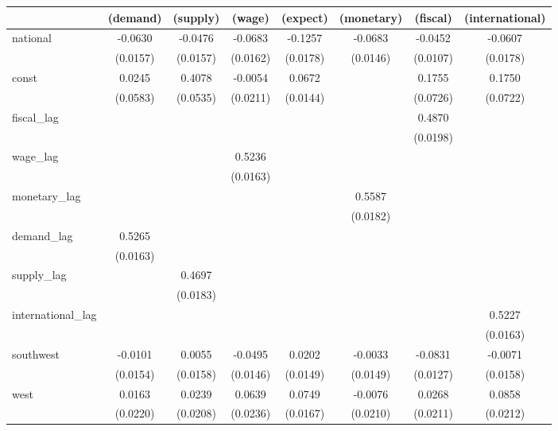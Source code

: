 \begin{tabular}{lccccccc}
\toprule
 & (demand) & (supply) & (wage) & (expect) & (monetary) & (fiscal) & (international) \\
\midrule
national & -0.0630 & -0.0476 & -0.0683 & -0.1257 & -0.0683 & -0.0452 & -0.0607 \\
\vspace{0.2cm}
 & (0.0157) & (0.0157) & (0.0162) & (0.0178) & (0.0146) & (0.0107) & (0.0178) \\
const & 0.0245 & 0.4078 & -0.0054 & 0.0672 &  & 0.1755 & 0.1750 \\
\vspace{0.2cm}
 & (0.0583) & (0.0535) & (0.0211) & (0.0144) &  & (0.0726) & (0.0722) \\
fiscal_lag &  &  &  &  &  & 0.4870 &  \\
\vspace{0.2cm}
 &  &  &  &  &  & (0.0198) &  \\
wage_lag &  &  & 0.5236 &  &  &  &  \\
\vspace{0.2cm}
 &  &  & (0.0163) &  &  &  &  \\
monetary_lag &  &  &  &  & 0.5587 &  &  \\
\vspace{0.2cm}
 &  &  &  &  & (0.0182) &  &  \\
demand_lag & 0.5265 &  &  &  &  &  &  \\
\vspace{0.2cm}
 & (0.0163) &  &  &  &  &  &  \\
supply_lag &  & 0.4697 &  &  &  &  &  \\
\vspace{0.2cm}
 &  & (0.0183) &  &  &  &  &  \\
international_lag &  &  &  &  &  &  & 0.5227 \\
\vspace{0.2cm}
 &  &  &  &  &  &  & (0.0163) \\
southwest & -0.0101 & 0.0055 & -0.0495 & 0.0202 & -0.0033 & -0.0831 & -0.0071 \\
\vspace{0.2cm}
 & (0.0154) & (0.0158) & (0.0146) & (0.0149) & (0.0149) & (0.0127) & (0.0158) \\
west & 0.0163 & 0.0239 & 0.0639 & 0.0749 & -0.0076 & 0.0268 & 0.0858 \\
\vspace{0.2cm}
 & (0.0220) & (0.0208) & (0.0236) & (0.0167) & (0.0210) & (0.0211) & (0.0212) \\

\end{tabular}

